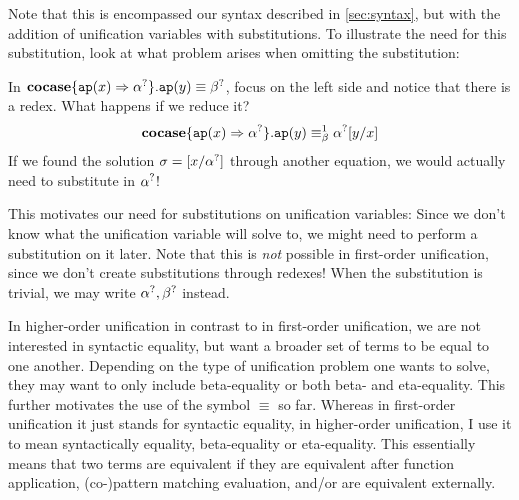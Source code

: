 \documentclass[twoside,12pt,a4paper]{article}
\begin{document}
Note that this is encompassed our syntax described in \ref{sec:syntax},
but with the addition of unification variables with substitutions. 
To illustrate the need for this substitution, look at what problem arises when omitting the substitution:
\begin{example}
    In $\textbf{cocase}\{\texttt{ap}(x)\Rightarrow\alpha^?\}.\texttt{ap}(y)\equiv\beta^?$, focus on the left side and notice that there is a redex. What happens if we reduce it?
    \begin{align*}
        \textbf{cocase}\{\texttt{ap}(x)\Rightarrow\alpha^?\}.\texttt{ap}(y)\equiv_{\beta}^1\alpha^?[y/x]    
    \end{align*}     
    If we found the solution $\sigma = [x/ \alpha^?]$ through another equation, we would actually need to substitute in $\alpha^?$!
\end{example}

This motivates our need for substitutions on unification variables: 
Since we don't know what the unification variable will solve to, we might need to perform a substitution on it later.
Note that this is \textit{not} possible in first-order unification, since we don't create substitutions through redexes! 
When the substitution is trivial, we may  write $\alpha^?, \beta^?$ instead.

In higher-order unification in contrast to in first-order unification, we are not interested in syntactic equality, but want a broader set of terms to be equal to one another.
Depending on the type of unification problem one wants to solve, they may want to only include beta-equality or both 
beta- and eta-equality.
This further motivates the use of the symbol $\equiv$ so far. Whereas in first-order unification it just stands for syntactic equality, 
in higher-order unification, I use it to mean syntactically equality, beta-equality or eta-equality.
This essentially means that two terms are equivalent if they are equivalent after function application, (co-)pattern matching evaluation, and/or are equivalent externally.
\end{document}
